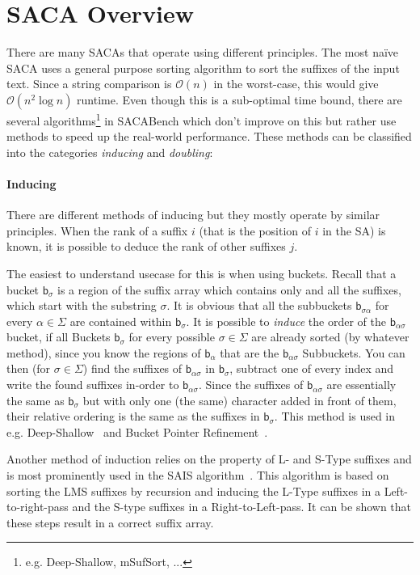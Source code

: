 \section{SACA Overview}

There are many SACAs that operate using different principles.
The most na\"ive SACA uses a general purpose sorting algorithm to sort the suffixes of the input text.
Since a string comparison is $\mathcal O (n)$ in the worst-case, this would give $\mathcal O (n^2 \log n)$ runtime.
Even though this is a sub-optimal time bound,
there are several algorithms\footnote{e.g. Deep-Shallow, mSufSort, ...} in SACABench which don't improve on this
but rather use methods to speed up the real-world performance.
These methods can be classified into the categories \emph{inducing} and \emph{doubling}:
%
\paragraph{Inducing} %
There are different methods of inducing but they mostly operate by similar principles.
When the rank of a suffix $i$ (that is the position of $i$ in the SA) is known,
it is possible to deduce the rank of other suffixes $j$.

The easiest to understand usecase for this is when using buckets.
Recall that a bucket $\mathsf b_{\sigma}$ is a region of the suffix
array which contains only and all the suffixes,
which start with the substring $\sigma$.
It is obvious that all the subbuckets $\mathsf b_{\sigma\alpha}$ for
every $\alpha \in \Sigma$ are contained within $\mathsf b_\sigma$.
It is possible to \emph{induce} the order of the $\mathsf b_{\alpha\sigma}$ bucket,
if all Buckets $\mathsf b_\sigma$ for every possible $\sigma \in \Sigma$ are already sorted (by whatever method),
since you know the regions of $\mathsf b_\alpha$ that are the $\mathsf b_{\alpha\sigma}$ Subbuckets.
You can then (for $\sigma \in \Sigma$) find the suffixes of $\mathsf b_{\alpha\sigma}$ in $\mathsf b_{\sigma}$,
subtract one of every index and write the found suffixes in-order to $\mathsf b_{\alpha\sigma}$.
Since the suffixes of $\mathsf b_{\alpha\sigma}$ are essentially the same as $\mathsf b_\sigma$ but
with only one (the same) character added in front of them,
their relative ordering is the same as the suffixes in $\mathsf b_\sigma$.
This method is used in e.g. Deep-Shallow~\cite{saca:4} and 
Bucket Pointer Refinement~\cite{saca:2}.

Another method of induction relies on the property of L- and S-Type suffixes and
is most prominently used in the SAIS algorithm~\cite{saca:6}.
This algorithm is based on sorting the LMS suffixes by recursion
and inducing the L-Type suffixes in a Left-to-right-pass and the S-type suffixes in a Right-to-Left-pass.
It can be shown that these steps result in a correct suffix array.

